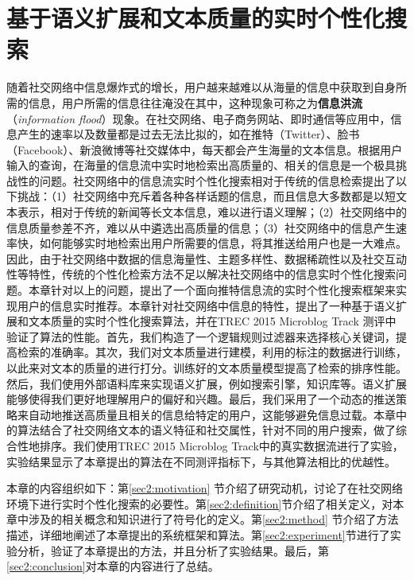 \chapter{基于语义扩展和文本质量的实时个性化搜索}
\label{chap2:main}
随着社交网络中信息爆炸式的增长，用户越来越难以从海量的信息中获取到自身所需的信息，用户所需的信息往往淹没在其中，这种现象可称之为\textbf{信息洪流}（\textit{information flood}）现象。在社交网络、电子商务网站、即时通信等应用中，信息产生的速率以及数量都是过去无法比拟的，如在推特（Twitter）、脸书（Facebook）、新浪微博等社交媒体中，每天都会产生海量的文本信息。根据用户输入的查询，在海量的信息流中实时地检索出高质量的、相关的信息是一个极具挑战性的问题。社交网络中的信息流实时个性化搜索相对于传统的信息检索提出了以下挑战：（1）社交网络中充斥着各种各样话题的信息，而且信息大多数都是以短文本表示，相对于传统的新闻等长文本信息，难以进行语义理解；（2）社交网络中的信息质量参差不齐，难以从中遴选出高质量的信息；（3）社交网络中的信息产生速率快，如何能够实时地检索出用户所需要的信息，将其推送给用户也是一大难点。因此，由于社交网络中数据的信息海量性、主题多样性、数据稀疏性以及社交互动性等特性，传统的个性化检索方法不足以解决社交网络中的信息实时个性化搜索问题。本章针对以上的问题，提出了一个面向推特信息流的实时个性化搜索框架来实现用户的信息实时推荐。本章针对社交网络中信息的特性，提出了一种基于语义扩展和文本质量的实时个性化搜索算法，并在TREC 2015 Microblog Track 测评中验证了算法的性能。首先，我们构造了一个逻辑规则过滤器来选择核心关键词，提高检索的准确率。其次，我们对文本质量进行建模，利用的标注的数据进行训练，以此来对文本的质量的进行打分。训练好的文本质量模型提高了检索的排序性能。然后，我们使用外部语料库来实现语义扩展，例如搜索引擎，知识库等。语义扩展能够使得我们更好地理解用户的偏好和兴趣。最后，我们采用了一个动态的推送策略来自动地推送高质量且相关的信息给特定的用户，这能够避免信息过载。本章中的算法结合了社交网络文本的语义特征和社交属性，针对不同的用户搜索，做了综合性地排序。我们使用TREC 2015 Microblog Track中的真实数据流进行了实验，实验结果显示了本章提出的算法在不同测评指标下，与其他算法相比的优越性。

本章的内容组织如下：第\ref{sec2:motivation} 节介绍了研究动机，讨论了在社交网络环境下进行实时个性化搜索的必要性。第\ref{sec2:definition}节介绍了相关定义，对本章中涉及的相关概念和知识进行了符号化的定义。第\ref{sec2:method} 节介绍了方法描述，详细地阐述了本章提出的系统框架和算法。第\ref{sec2:experiment}节进行了实验分析，验证了本章提出的方法，并且分析了实验结果。最后，第\ref{sec2:conclusion}对本章的内容进行了总结。

